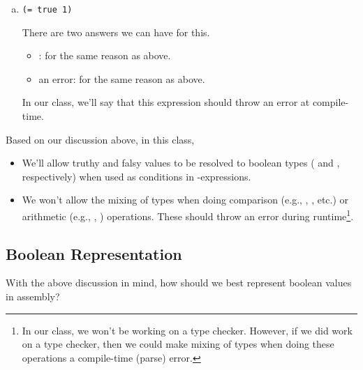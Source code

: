 \documentclass[letterpaper]{article}
\begin{document}
\begin{mdframed}
\begin{enumerate}[a.]
        \item \begin{verbatim}
(= true 1)\end{verbatim}

        \begin{mdframed}
            There are two answers we can have for this. 
            \begin{itemize}
                \item {}: for the same reason as above.
                \item an error: for the same reason as above. 
            \end{itemize}
            In our class, we'll say that this expression should throw an error at compile-time.
        \end{mdframed}
    \end{enumerate}
\end{mdframed}
Based on our discussion above, in this class, 
\begin{itemize}
    \item We'll allow truthy and falsy values to be resolved to boolean types ( and , respectively) when used as conditions in -expressions.
    \item We won't allow the mixing of types when doing comparison (e.g., \code{=}, \code{<}, etc.) or arithmetic (e.g., \code{+}, \code{-}) operations. These should throw an error during runtime\footnote{In our class, we won't be working on a type checker. However, if we did work on a type checker, then we could make mixing of types when doing these operations a compile-time (parse) error.}.
\end{itemize}

\subsection{Boolean Representation}
With the above discussion in mind, how should we best represent boolean values in assembly?
\end{document}
